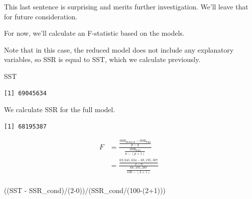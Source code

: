 \documentclass[
  letterpaper,
  DIV=11,
  numbers=noendperiod]{scrreprt}
\newenvironment{Shaded}{\begin{snugshade}}{\end{snugshade}}
\newcommand{\DecValTok}[1]{\textcolor[rgb]{0.68,0.00,0.00}{#1}}
\newcommand{\FunctionTok}[1]{\textcolor[rgb]{0.28,0.35,0.67}{#1}}
\newcommand{\NormalTok}[1]{\textcolor[rgb]{0.00,0.23,0.31}{#1}}
\newcommand{\OtherTok}[1]{\textcolor[rgb]{0.00,0.23,0.31}{#1}}
\newcommand{\SpecialCharTok}[1]{\textcolor[rgb]{0.37,0.37,0.37}{#1}}
\begin{document}
This last sentence is surprising and merits further investigation. We'll
leave that for future consideration.

For now, we'll calculate an F-statistic based on the models.

Note that in this case, the reduced model does not include any
explanatory variables, so SSR is equal to SST, which we calculate
previously.

\begin{Shaded}
\begin{Highlighting}[]
\NormalTok{SST}
\end{Highlighting}
\end{Shaded}

\begin{verbatim}
[1] 69045634
\end{verbatim}

We calculate SSR for the full model.

\begin{Shaded}
\end{Shaded}

\begin{verbatim}
[1] 68195387
\end{verbatim}

\[
\begin{aligned}
F &= \frac{\frac{\text{SSR}_{\text{Reduced}}-\text{SSR}_{\text{Full}}}{p-q}}{\frac{\text{SSR}_{\text{Full}}}{n-(p+1)}} \\
&=\frac{\frac{69,045,634-68,195,387}{2-0}}{\frac{68,195,387}{100-(2+1)}} \\
\end{aligned}
\]

\begin{Shaded}
\begin{Highlighting}[]
\NormalTok{((SST }\SpecialCharTok{{-}}\NormalTok{ SSR\_cond)}\SpecialCharTok{/}\NormalTok{(}\DecValTok{2{-}0}\NormalTok{))}\SpecialCharTok{/}\NormalTok{(SSR\_cond}\SpecialCharTok{/}\NormalTok{(}\DecValTok{100}\SpecialCharTok{{-}}\NormalTok{(}\DecValTok{2}\SpecialCharTok{+}\DecValTok{1}\NormalTok{)))}
\end{Highlighting}
\end{Shaded}
\end{document}
